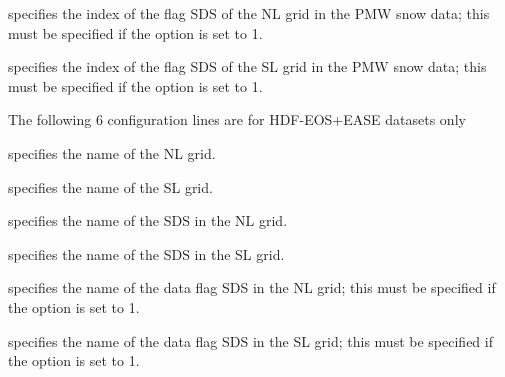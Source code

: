  specifies the index of the flag SDS of the NL grid in the PMW snow data;
 this must be specified if
 the  option is set to 1.

 specifies the index of the flag SDS of the SL grid in the PMW snow data;
 this must be specified if
 the  option is set to 1.

 The following 6 configuration lines are for HDF-EOS+EASE datasets only

  specifies the name of the NL grid.

  specifies the name of the SL grid.

  specifies the name of the SDS in the
 NL grid.

  specifies the name of the SDS in the
 SL grid.

  specifies the name of
 the data
 flag SDS in the NL grid; this must be specified if
 the  option is set to 1.

  specifies the name of
 the data
 flag SDS in the SL grid; this must be specified if
 the  option is set to 1.
 

